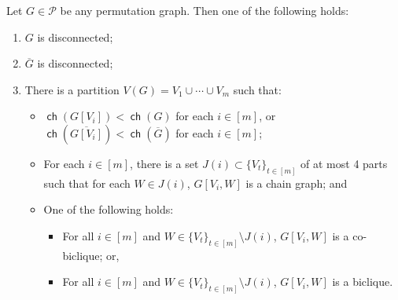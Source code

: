 \documentclass{theoretics}
\newcommand{\cP}{\ensuremath{\mathcal{P}}}
\DeclareMathOperator\ch{\mathsf{ch}}
\begin{document}
\begin{lemma}
	\label{lemma:permutation decomposition}
	Let $G \in \cP$ be any permutation graph. Then one of the following holds:
	\begin{enumerate}[label=\textup{(\arabic*)}]
		\item $G$ is disconnected;
		\item $\overline G$ is disconnected;
		\item There is a partition $V(G) = V_1 \cup \dotsm \cup V_m$ such that:
		\begin{itemize}
			\item $\ch(G[V_i]) < \ch(G)$ for each $i \in [m]$, or $\ch(\overline{G[V_i]}) < \ch(\overline G)$ for each $i \in [m]$;
			\item For each $i \in [m]$, there is a set $J(i) \subset \{ V_t \}_{t \in [m]}$ of at most 4 parts such that
			for each $W \in J(i)$, $G[V_i,W]$ is a chain graph; and
			\item One of the following holds:
			\begin{itemize}
				\item For all $i \in [m]$ and $W \in \{V_t\}_{t \in [m]} \setminus J(i)$, $G[V_i,W]$ is a
				co-biclique; or,
				\item For all $i \in [m]$ and $W \in \{V_t\}_{t \in [m]} \setminus J(i)$, $G[V_i,W]$ is a
				biclique.
			\end{itemize}
		\end{itemize}
	\end{enumerate}
\end{lemma}
\end{document}
